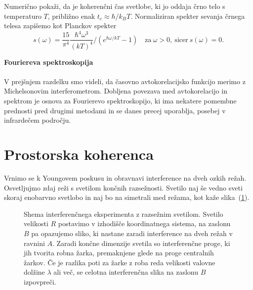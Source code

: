 \begin{definition}\label{naloga-Planck}
Numerično pokaži, da je koherenčni čas svetlobe, ki jo oddaja črno telo s temperaturo $T$, približno enak
$t_{c}\approx{\hbar}/{k_{B}T}$. Normaliziran spekter sevanja črnega telesa zapišemo 
kot Planckov spekter 
\begin{equation}
s(\omega)=\frac{15}{\pi^{4}} \frac{\hbar^4\omega^3}{(kT)^4}/\left(e^{\hbar\omega/kT}-1\right)
\quad \textrm{za}~\omega >0,~\textrm{sicer}~s(\omega) = 0.
\label{eq:Planckov-spekter}
\end{equation}
\end{definition}

\begin{remark}{{\bf Fouriereva spektroskopija}}\\ \\
V prejšnjem razdelku smo videli, da časovno avtokorelacijsko funkcijo
merimo z Michelsonovim interferometrom. Dobljena povezava med
avtokorelacijo in spektrom je osnova za Fourierevo spektroskopijo,
ki ima nekatere pomembne prednosti pred drugimi metodami in se danes
precej uporablja, posebej v infrardečem področju.
\end{remark}

\section{Prostorska koherenca}
\label{Prostorska-koherenca}
Vrnimo se k Youngovem poskusu in obravnavi interference
 na dveh ozkih režah. 
Osvetljujmo zdaj reži s svetilom končnih razsežnosti. Svetilo naj še vedno sveti skoraj enobarvno
svetlobo in naj bo na simetrali med režama, kot kaže slika~(\ref{fig:shema-interferenca}).
\begin{figure}[h]
\centering
\def\svgwidth{140truemm} 

\caption{Shema interferenčnega eksperimenta z razsežnim svetilom.
Svetilo velikosti $R$ postavimo v izhodišče koordinatnega sistema,
na zaslonu $B$ pa opazujemo sliko, ki nastane zaradi interference na dveh režah v
ravnini $A$. Zaradi končne dimenzije svetila so interferenčne proge,
ki jih tvorita robna žarka, premaknjene glede na proge centralnih
žarkov. Če je razlika poti za žarke z roba reda velikosti valovne
dolžine $\lambda$ ali več, se celotna interferenčna slika na zaslonu
$B$ izpovpreči.}
\label{fig:shema-interferenca}
\end{figure}

